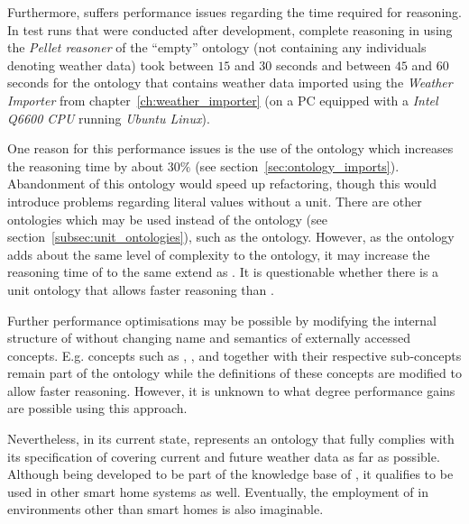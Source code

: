 Furthermore, \thinkhomeweather suffers performance issues regarding the time required for reasoning. In test runs that were conducted after development, complete reasoning in \protege using the \emph{Pellet reasoner} of the ``empty'' ontology (not containing any individuals denoting weather data) took between $15$ and $30$ seconds and between $45$ and $60$ seconds for the ontology that contains weather data imported using the \emph{Weather Importer} from chapter~\ref{ch:weather_importer} (on a PC equipped with a \emph{Intel Q6600 CPU} running \emph{Ubuntu Linux}). %

One reason for this performance issues is the use of the \muo ontology which increases the reasoning time by about $30 \%$ (see section~\ref{sec:ontology_imports}). Abandonment of this ontology would speed up refactoring, though this would introduce problems regarding literal values without a unit. There are other ontologies which may be used instead of the \muo ontology (see section~\ref{subsec:unit_ontologies}), such as the  ontology. However, as the  ontology adds about the same level of complexity to the ontology, it may increase the reasoning time of \thinkhome to the same extend as \muo. It is questionable whether there is a unit ontology that allows faster reasoning than \muo.

Further performance optimisations may be possible by modifying the internal structure of \thinkhome without changing name and semantics of externally accessed concepts. E.g. concepts such as , , and  together with their respective sub-concepts remain part of the ontology while the definitions of these concepts are modified to allow faster reasoning. However, it is unknown to what degree performance gains are possible using this approach.

\vspace{1cm}

Nevertheless, in its current state, \thinkhomeweather represents an ontology that fully complies with its specification of covering current and future weather data as far as possible. Although being developed to be part of the knowledge base of \thinkhome, it qualifies to be used in other smart home systems as well. Eventually, the employment of \thinkhomeweather in environments other than smart homes is also imaginable.
